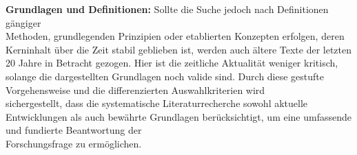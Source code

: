         \textbf{Grundlagen und Definitionen:} Sollte die Suche jedoch nach Definitionen gängiger \\ Methoden, grundlegenden Prinzipien oder etablierten Konzepten erfolgen, deren Kerninhalt über die Zeit stabil geblieben ist, werden auch ältere Texte der letzten 20 Jahre in Betracht gezogen. Hier ist die zeitliche Aktualität weniger kritisch, solange die dargestellten Grundlagen noch valide sind.
\nAbsatz
Durch diese gestufte Vorgehensweise und die differenzierten Auswahlkriterien wird \\ sichergestellt, dass die systematische Literaturrecherche sowohl aktuelle Entwicklungen als auch bewährte Grundlagen berücksichtigt, um eine umfassende und fundierte Beantwortung der \\ Forschungsfrage zu ermöglichen.


 